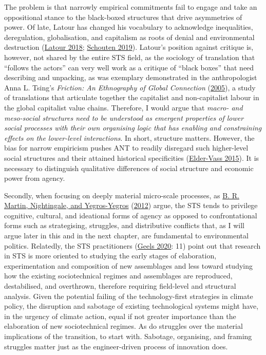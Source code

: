\documentclass[a4paper, nobind]{templates/ociamthesis}
\begin{document}
The problem is that narrowly empirical commitments fail to engage and take an oppositional stance to the black-boxed structures that drive asymmetries of power. Of late, Latour has changed his vocabulary to acknowledge inequalities, deregulation, globalisation, and capitalism as roots of denial and environmental destruction (\protect\hyperlink{ref-latour_earth_2018}{Latour 2018}; \protect\hyperlink{ref-latour_climate_2019}{Schouten 2019}). Latour's position against critique is, however, not shared by the entire STS field, as the sociology of translation that ``follows the actors'' can very well work as a critique of ``black boxes'' that need describing and unpacking, as was exemplary demonstrated in the anthropologist Anna L. Tsing's \emph{Friction: An Ethnography of Global Connection} (\protect\hyperlink{ref-tsing_friction_2005}{2005}), a study of translations that articulate together the capitalist and non-capitalist labour in the global capitalist value chains. Therefore, I would argue that \emph{macro- and meso-social structures need to be understood as emergent properties of lower social processes with their own organising logic that has enabling and constraining effects on the lower-level interactions}. In short, structure matters. However, the bias for narrow empiricism pushes ANT to readily disregard such higher-level social structures and their attained historical specificities (\protect\hyperlink{ref-elder-vass_disassembling_2015}{Elder-Vass 2015}). It is necessary to distinguish qualitative differences of social structure and economic power from agency.

Secondly, when focusing on deeply material micro-scale processes, as \protect\hyperlink{ref-martin_science_2012}{B. R. Martin, Nightingale, and Yegros-Yegros} (\protect\hyperlink{ref-martin_science_2012}{2012}) argue, the STS tends to privilege cognitive, cultural, and ideational forms of agency as opposed to confrontational forms such as strategising, struggles, and distributive conflicts that, as I will argue later in this and in the next chapter, are fundamental to environmental politics. Relatedly, the STS practitioners (\protect\hyperlink{ref-geels_micro-foundations_2020}{Geels 2020}: 11) point out that research in STS is more oriented to studying the early stages of elaboration, experimentation and composition of new assemblages and less toward studying how the existing sociotechnical regimes and assemblages are reproduced, destabilised, and overthrown, therefore requiring field-level and structural analysis. Given the potential failing of the technology-first strategies in climate policy, the disruption and sabotage of existing technological systems might have, in the urgency of climate action, equal if not greater importance than the elaboration of new sociotechnical regimes. As do struggles over the material implications of the transition, to start with. Sabotage, organising, and framing struggles matter just as the engineer-driven process of innovation does.
\end{document}
